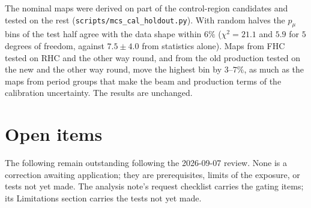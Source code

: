 The nominal maps were derived on part of the control-region candidates and tested on the rest
(\texttt{scripts/mcs\_cal\_holdout.py}). With random halves the $p_\mu$ bins of the test half agree with the data
shape within $6\%$ ($\chi^2=21.1$ and $5.9$ for $5$ degrees of freedom, against $7.5\pm4.0$ from statistics alone).
Maps from FHC tested on RHC and the other way round, and from the old production tested on the new and the other way
round, move the highest bin by $3$--$7\%$, as much as the maps from period groups that make the beam and production
terms of the calibration uncertainty. The results are unchanged.

\section{Open items}

The following remain outstanding following the 2026-09-07 review. None is a correction awaiting application;
they are prerequisites, limits of the exposure, or tests not yet made. The analysis note's
request checklist carries the gating items; its Limitations section carries the tests not
yet made.

